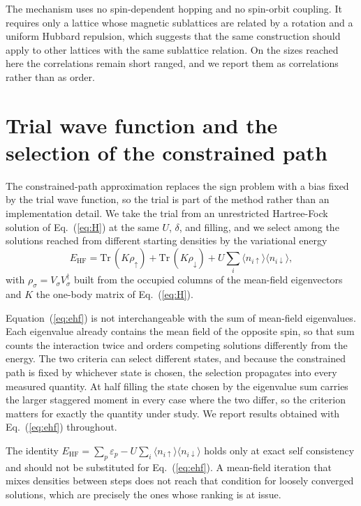 \documentclass[aps,prb,reprint,superscriptaddress,amsmath,amssymb,floatfix]{revtex4-2}
\begin{document}
The mechanism uses no spin-dependent hopping and no spin-orbit coupling. It
requires only a lattice whose magnetic sublattices are related by a rotation and a
uniform Hubbard repulsion, which suggests that the same construction should apply
to other lattices with the same sublattice relation. On the sizes reached here the
correlations remain short ranged, and we report them as correlations rather than
as order.

\appendix

\section{Trial wave function and the selection of the constrained path}
\label{app:trial}

The constrained-path approximation replaces the sign problem with a bias fixed by
the trial wave function, so the trial is part of the method rather than an
implementation detail. We take the trial from an unrestricted Hartree-Fock
solution of Eq.~(\ref{eq:H}) at the same $U$, $\delta$, and filling, and we select
among the solutions reached from different starting densities by the variational
energy
\begin{equation}
E_{\mathrm{HF}} = \mathrm{Tr}\,(K \rho_{\uparrow}) + \mathrm{Tr}\,(K \rho_{\downarrow})
                + U \sum_i \langle n_{i\uparrow}\rangle \langle n_{i\downarrow}\rangle ,
\label{eq:ehf}
\end{equation}
with $\rho_{\sigma} = V_{\sigma} V_{\sigma}^{\dagger}$ built from the occupied
columns of the mean-field eigenvectors and $K$ the one-body matrix of
Eq.~(\ref{eq:H}).

Equation~(\ref{eq:ehf}) is not interchangeable with the sum of mean-field
eigenvalues. Each eigenvalue already contains the mean field of the opposite
spin, so that sum counts the interaction twice and orders competing solutions
differently from the energy. The two criteria can select different states, and
because the constrained path is fixed by whichever state is chosen, the selection
propagates into every measured quantity. At half filling the state chosen by the
eigenvalue sum carries the larger staggered moment in every case where the two
differ, so the criterion matters for exactly the quantity under study. We report
results obtained with Eq.~(\ref{eq:ehf}) throughout.

The identity
$E_{\mathrm{HF}} = \sum_p \varepsilon_p - U \sum_i \langle n_{i\uparrow}\rangle
\langle n_{i\downarrow}\rangle$
holds only at exact self consistency and should not be substituted for
Eq.~(\ref{eq:ehf}). A mean-field iteration that mixes densities between steps does
not reach that condition for loosely converged solutions, which are precisely the
ones whose ranking is at issue.
\end{document}
